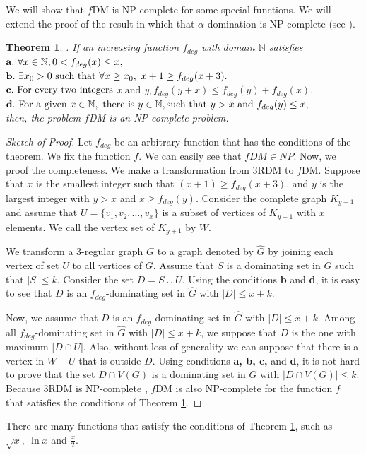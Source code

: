 \documentclass[a0,portrait]{a0poster}
\theoremstyle{definition}
\theoremstyle{plain}
\newtheorem{theorem}[definition]{Theorem}
\theoremstyle{definition}
\begin{document}
\begin{multicols}{2}
 We will show that $f$DM is NP-complete for some special functions. We will extend  the proof of the result in which that $\alpha$-domination is NP-complete (see \cite{dunbar2000alpha}). 
\begin{theorem}.
If an increasing function $f_{deg}$ with domain $\mathbb{N}$ satisfies
\\ 
${\bf  a}.~ \forall x\in \mathbb{N},  0<f_{deg}(x)\leq x,$
\\
${\bf  b}.~ \exists x_0>0 \mbox{ such that }\forall x\geq x_0, ~x+1\geq f_{deg}(x+3).$
\\
${\bf  c}.~\mbox{For every two integers }$x$ \mbox{ and } $y$,  f_{deg}(y+x)\leq f_{deg}(y)+f_{deg}(x),$
\\
${\bf  d}. ~{\mbox {For a given~} } x\in\mathbb{N}, \mbox{ there is } y\in \mathbb{N}, \mbox{such that } y>x \mbox{ and } f_{deg}(y)\leq x,$
\\
then, the problem $f$DM is an NP-complete problem.
\label{thmNPf}
\end{theorem}
\begin{proof}[Sketch of Proof]
Let $f_{deg}$ be an arbitrary function that has the conditions of the theorem. We fix the function $f$. We can easily see that  $fDM\in NP$. Now, we proof the completeness.    We make a transformation from 3RDM to $f$DM.  Suppose that   $x$ is  the smallest  integer such that $(x+1)\geq f_{deg}(x +3)$,  and  $y$ is  the largest integer with $y>x$ and $x\geq f_{deg}(y)$. Consider the complete graph  $K_{y+1}$  and assume that $U=\{v_1, v_2, \ldots, v_x\}$ is {a subset of vertices of $K_{y+1}$ with $x$ elements}. We call the vertex set of $K_{y+1}$ by $W$. 

We transform a 3-regular graph $G$ to a graph denoted by $\hat{G}$ by  joining each vertex of  set $U$ to all vertices of $G$.   Assume that $S$ is a dominating set in $G$ such that  $|S|\leq k$. Consider {the} set $D = S \cup U$. Using the conditions {\bf b} and {\bf d}, it is easy to see that $D$ is an $f_{deg}$-dominating set in  $\hat{G}$ with $|D|\leq x+k$.

Now, we assume that $D$ is an $f_{deg}$-dominating set in  $\hat{G}$ with $|D|\leq x+k$. Among all $f_{deg}$-dominating set in $\hat{G}$ with $|D|\leq x+k$, we suppose that $D$ is {the} one {with} maximum $|D\cap U|$. Also, without loss of generality we can suppose that  there is  a vertex in $W-U$ that is outside  $D$. Using conditions {\bf a, b, c,} and {\bf d}, it is not  hard to prove that the set $D \cap V(G)$ is  a dominating set in $G$ with $|D \cap V(G)|\leq k$. Because 3RDM  is  NP-complete \cite{garey2002computers}, $f$DM is also NP-complete for the function $f$ that satisfies the conditions of Theorem \ref{thmNPf}.
\end{proof}
There are many functions that satisfy the conditions of Theorem \ref{thmNPf}, such as $\sqrt{x},~ \ln x$ and $\frac{x}{2}$.

\end{multicols}
\end{document}
